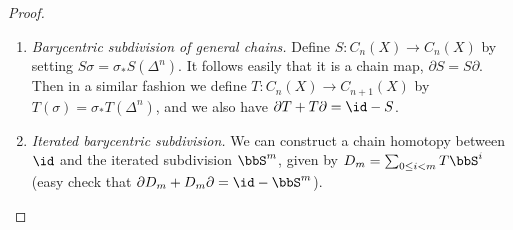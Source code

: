 \begin{proof}
\begin{enumerate}
         Each point $b\in Y$ determines a homomorphism $b:\rmL_n(Y)\to L_{n+1}(Y)$ defined on simplices by $b(\langle w_0,\ldots,w_n\rangle)=\langle b,w_0,\ldots,w_n\rangle$ (a ``cone operator''). It is easy to check that $\partial b+b\partial =\id$, so $b$ is a chain homotopy between the identity and zero on the augmented chain complex $L_\bullet(Y)$.
         
         Define the subdivision homomorphism $S:\rmL_n(Y)\to \rmL_n(Y)$ by induction in the degree. Denoting by $b_\lambda$ the image of the barycenter in a linear singular simplex $\lambda:\Delta^n\to Y$. Then the inductive formula for $S$ is $S(\lambda)=b_\lambda(S\partial\lambda)$, where $b_\lambda$ was defined above.
         
         Then one checks that $\partial S=S\partial$ so that $S$ provides a chain map from $L_\bullet(Y)$ to itself. Next we build a chain homotopy $T:\rmL_n(Y)\to L_{n+1}(Y)$ between $S$ and the identity. It is defined inductively by $T_{n=-1}=0$ and $T(\lambda)=b_\lambda(\lambda-T\partial\lambda)$ for $n\geq 0$. The geometric interpretation of this formula is that we inductively subdivide $\Delta^n\times I$ by joining all simplices in the bottom and side faces of the prism to the barycenter of the top face, and $T$ takes the image of this subdivision under the projection $\Delta^n\times I\to \Delta^n$. Finally one verifies that $\partial T+T\partial=\id-S$.
         
         \item \emph{Barycentric subdivision of general chains.} Define $S:C_n(X)\to C_n(X)$ by setting $S\sigma=\sigma_\ast S(\Delta^n)$. It follows easily that it is a chain map, $\partial S=S\partial$. Then in a similar fashion we define $T:C_n(X)\to C_{n+1}(X)$ by $T(\sigma)=\sigma_\ast T(\Delta^n)$, and we also have $\partial T+T\partial =\id -S$.
         
         \item \emph{Iterated barycentric subdivision.} We can construct a chain homotopy between $\id$ and the iterated subdivision $\bbS^m$, given by $D_m=\sum _{0\leq i<m}T\bbS^i$ (easy check that $\partial D_m+D_m\partial=\id -\bbS^m$). 
         

\end{enumerate}
\end{proof}
